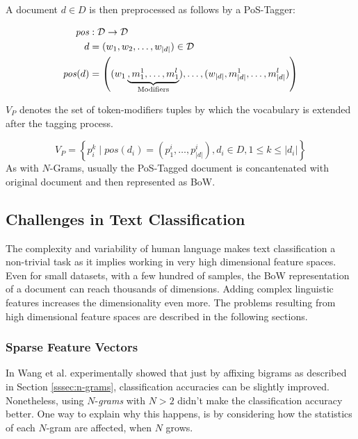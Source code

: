 A document $d \in D$ is then preprocessed as follows by a PoS-Tagger:

\begin{equation*}
\begin{split}
	\mathit{pos} &:  \mathcal{D} \to \mathcal{D} \\
	d &= (w_1,w_2,\ldots,w_{|d|}) \in \mathcal{D} \\
	\mathit{pos}(d) &=  \left((w_1\underbrace{,
	m_1^1, \ldots,m_1^l}_{\mathrm{Modifiers}}), \ldots,
	(w_{|d|},m_{|d|}^1,\ldots,m_{|d|}^l)\right) \\ 
\end{split}
\end{equation*}

$V_P$ denotes the set of token-modifiers tuples by which
the vocabulary is extended after the tagging process. 

\begin{equation*}
V_P = \left\{ p_i^k \mid pos(d_i) = (p_1^i,\ldots,p_{|d|}^i), d_i \in D, 1 \leq
k \leq |d_i| \right\}
\end{equation*}
As with $N$-Grams, usually
the PoS-Tagged document is concantenated with original document and then
represented as BoW.

\subsection{Challenges in Text Classification}

The complexity and variability of human language makes text
classification a non-trivial task as it implies working in very high
dimensional feature spaces. Even for small datasets, with a few hundred of
samples, the BoW representation of a document can reach thousands of dimensions.
Adding complex linguistic features increases the dimensionality even more. The
problems resulting from high dimensional feature spaces are described in the
following sections.

\subsubsection{Sparse Feature Vectors}

In \cite{wang2012baselines} Wang et al. experimentally showed that just by
affixing bigrams as described in Section \ref{sssec:n-grams}, classification
accuracies can be slightly improved.
Nonetheless, using $N$-\textit{grams} with $N > 2$ didn't make the
classification accuracy better.
One way to explain why this happens, is by considering how the
statistics of each $N$-gram are affected, when $N$ grows.
 
